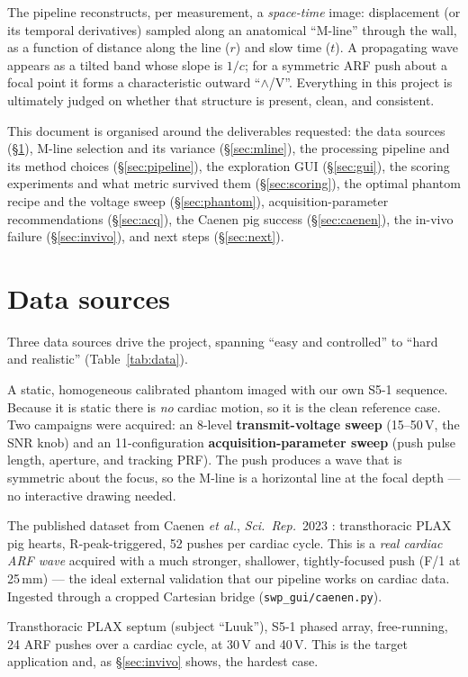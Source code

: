 \documentclass[11pt,a4paper]{article}
\begin{document}
The pipeline reconstructs, per measurement, a \emph{space-time} image: displacement (or its temporal
derivatives) sampled along an anatomical ``M-line'' through the wall, as a function of distance along the
line ($r$) and slow time ($t$). A propagating wave appears as a tilted band whose slope is $1/c$; for a
symmetric ARF push about a focal point it forms a characteristic outward ``$\wedge$/V''. Everything in this
project is ultimately judged on whether that structure is present, clean, and consistent.

This document is organised around the deliverables requested: the data sources
(\S\ref{sec:data}), M-line selection and its variance (\S\ref{sec:mline}), the processing pipeline and its
method choices (\S\ref{sec:pipeline}), the exploration GUI (\S\ref{sec:gui}), the scoring experiments and
what metric survived them (\S\ref{sec:scoring}), the optimal phantom recipe and the voltage sweep
(\S\ref{sec:phantom}), acquisition-parameter recommendations (\S\ref{sec:acq}), the Caenen pig success
(\S\ref{sec:caenen}), the in-vivo failure (\S\ref{sec:invivo}), and next steps (\S\ref{sec:next}).

\section{Data sources}\label{sec:data}
Three data sources drive the project, spanning ``easy and controlled'' to ``hard and realistic''
(Table~\ref{tab:data}).

\begin{description}[leftmargin=1.2em]
  \item[Phantom (CIRS).] A static, homogeneous calibrated phantom imaged with our own S5-1 sequence. Because
  it is static there is \emph{no} cardiac motion, so it is the clean reference case. Two campaigns were
  acquired: an 8-level \textbf{transmit-voltage sweep} (15--50\,V, the SNR knob) and an 11-configuration
  \textbf{acquisition-parameter sweep} (push pulse length, aperture, and tracking PRF). The push produces a
  wave that is symmetric about the focus, so the M-line is a horizontal line at the focal depth --- no
  interactive drawing needed.
  \item[Caenen pig ARF-SWE.] The published dataset from Caenen \emph{et al.}, \emph{Sci.\ Rep.}\ 2023
  \cite{caenen2023}: transthoracic PLAX pig hearts, R-peak-triggered, 52 pushes per cardiac cycle. This is a
  \emph{real cardiac ARF wave} acquired with a much stronger, shallower, tightly-focused push (F/1 at
  25\,mm) --- the ideal external validation that our pipeline works on cardiac data. Ingested through a
  cropped Cartesian bridge (\texttt{swp\_gui/caenen.py}).
  \item[In-vivo human (our acquisition).] Transthoracic PLAX septum (subject ``Luuk''), S5-1 phased array,
  free-running, 24 ARF pushes over a cardiac cycle, at 30\,V and 40\,V. This is the target application and,
  as \S\ref{sec:invivo} shows, the hardest case.
\end{description}
\end{document}
